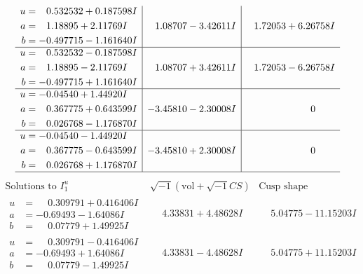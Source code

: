 \documentclass[1p]{elsarticle_modified}
\theoremstyle{definition}
\newcommand{\I}{\sqrt{-1}}
\begin{document}
$$\begin{array}{c|c|c}
\begin{aligned}
u &= \phantom{-}0.532532 + 0.187598 I \\
a &= \phantom{-}1.18895 + 2.11769 I \\
b &= -0.497715 - 1.161640 I\end{aligned}
 & \phantom{-}1.08707 - 3.42611 I & \phantom{-}1.72053 + 6.26758 I \\ \hline\begin{aligned}
u &= \phantom{-}0.532532 - 0.187598 I \\
a &= \phantom{-}1.18895 - 2.11769 I \\
b &= -0.497715 + 1.161640 I\end{aligned}
 & \phantom{-}1.08707 + 3.42611 I & \phantom{-}1.72053 - 6.26758 I \\ \hline\begin{aligned}
u &= -0.04540 + 1.44920 I \\
a &= \phantom{-}0.367775 + 0.643599 I \\
b &= \phantom{-}0.026768 - 1.176870 I\end{aligned}
 & -3.45810 - 2.30008 I & \phantom{-0.000000 } 0 \\ \hline\begin{aligned}
u &= -0.04540 - 1.44920 I \\
a &= \phantom{-}0.367775 - 0.643599 I \\
b &= \phantom{-}0.026768 + 1.176870 I\end{aligned}
 & -3.45810 + 2.30008 I & \phantom{-0.000000 } 0\\
 \hline 
 \end{array}$$\newpage$$\begin{array}{c|c|c}  
\text{Solutions to }I^u_{1}& \I (\text{vol} + \sqrt{-1}CS) & \text{Cusp shape}\\
 \hline 
\begin{aligned}
u &= \phantom{-}0.309791 + 0.416406 I \\
a &= -0.69493 - 1.64086 I \\
b &= \phantom{-}0.07779 + 1.49925 I\end{aligned}
 & \phantom{-}4.33831 + 4.48628 I & \phantom{-}5.04775 - 11.15203 I \\ \hline\begin{aligned}
u &= \phantom{-}0.309791 - 0.416406 I \\
a &= -0.69493 + 1.64086 I \\
b &= \phantom{-}0.07779 - 1.49925 I\end{aligned}
 & \phantom{-}4.33831 - 4.48628 I & \phantom{-}5.04775 + 11.15203 I \\ \hline\begin{aligned}

\end{aligned}
\end{array}$$
\end{document}
